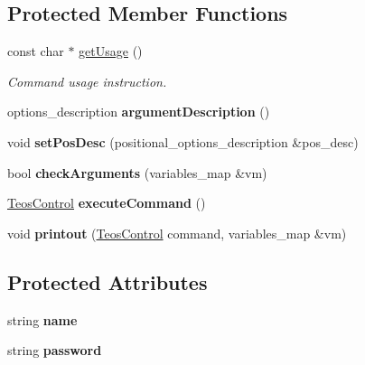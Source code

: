 \subsection*{Protected Member Functions}
\begin{DoxyCompactItemize}
\item 
const char $\ast$ \mbox{\hyperlink{classteos_1_1command_1_1_wallet_unlock_options_aa630c4deec62ef8d44cb37c03573c071}{get\+Usage}} ()
\begin{DoxyCompactList}\small\item\em Command \textquotesingle{}usage\textquotesingle{} instruction. \end{DoxyCompactList}\item 
\mbox{\label{classteos_1_1command_1_1_wallet_unlock_options_a668aae33dff94bcc5fe964cfd5712666}} 
options\+\_\+description {\bfseries argument\+Description} ()
\item 
\mbox{\label{classteos_1_1command_1_1_wallet_unlock_options_a7650a6cb1eb82ab04334561b5792b736}} 
void {\bfseries set\+Pos\+Desc} (positional\+\_\+options\+\_\+description \&pos\+\_\+desc)
\item 
\mbox{\label{classteos_1_1command_1_1_wallet_unlock_options_a3c8982dfec1c8affd25a7cb389388afb}} 
bool {\bfseries check\+Arguments} (variables\+\_\+map \&vm)
\item 
\mbox{\label{classteos_1_1command_1_1_wallet_unlock_options_a97a2d0020caa85625bb2611203468367}} 
\mbox{\hyperlink{classteos_1_1_teos_control}{Teos\+Control}} {\bfseries execute\+Command} ()
\item 
\mbox{\label{classteos_1_1command_1_1_wallet_unlock_options_acc359227ff0f0962753c5b1ffc264ae8}} 
void {\bfseries printout} (\mbox{\hyperlink{classteos_1_1_teos_control}{Teos\+Control}} command, variables\+\_\+map \&vm)
\end{DoxyCompactItemize}
\subsection*{Protected Attributes}
\begin{DoxyCompactItemize}
\item 
\mbox{\label{classteos_1_1command_1_1_wallet_unlock_options_a28631c65fbc2cf6f3ce740329fad87a4}} 
string {\bfseries name}
\item 
\mbox{\label{classteos_1_1command_1_1_wallet_unlock_options_a189cfcbe96d25146d7002ff5b8405485}} 
string {\bfseries password}
\end{DoxyCompactItemize}
